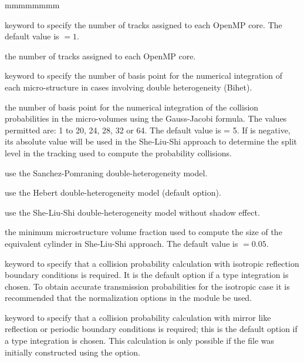\begin{ListeDeDescription}{mmmmmmmm}
\item[\moc{BATCH}] keyword to specify the number of tracks assigned to each OpenMP core. The default value is $=1$.

\item[\dusa{nbatch}] the number of tracks assigned to each OpenMP core.

\item[\moc{QUAB}] keyword to specify the number of basis point for the
numerical integration of each micro-structure in cases involving double
heterogeneity (Bihet).

\item[\dusa{iquab}] the number of basis point for the numerical integration of
the collision probabilities in the micro-volumes using the Gauss-Jacobi
formula. The values permitted are: 1 to 20, 24, 28, 32 or 64. The default value
is  = 5. If  is negative, its absolute value will be used in the She-Liu-Shi approach to determine the
split level in the tracking used to compute the probability collisions.

\item[\moc{SAPO}] use the Sanchez-Pomraning double-heterogeneity model.\cite{sapo}

\item[\moc{HEBE}] use the Hebert double-heterogeneity model (default option).\cite{BIHET}

\item[\moc{SLSI}] use the She-Liu-Shi double-heterogeneity model without shadow effect.\cite{She2017}

\item[\dusa{frtm}] the minimum microstructure volume fraction used to compute the size of the equivalent cylinder in She-Liu-Shi approach. The default value is  $=0.05$.

\item[\moc{PISO}] keyword to specify that a collision probability calculation with isotropic reflection boundary 
conditions is required. It is the default option if a  type integration is chosen. To obtain accurate
transmission probabilities for the isotropic case it is recommended that the normalization 
options in the  module be used. 

\item[\moc{PSPC}] keyword to specify that a collision probability calculation with mirror like reflection or periodic 
boundary conditions is required; this is the default option if a  type integration is chosen. 
This calculation is only possible if the file was initially constructed using the  option. 


\end{ListeDeDescription}
